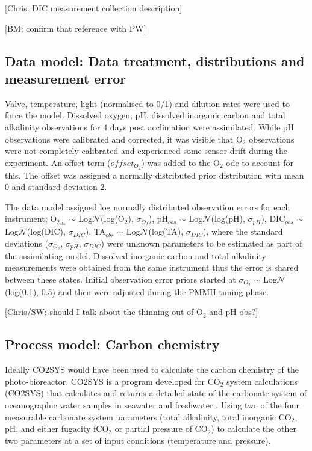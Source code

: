 \documentclass{ruthesis}
\begin{document}
[Chris: DIC measurement collection description]

[BM: confirm that reference with PW]


\subsection{Data model: Data treatment, distributions and measurement error}

Valve, temperature, light (normalised to 0/1) and dilution rates were used to force the model.
Dissolved oxygen, pH, dissolved inorganic carbon and total alkalinity observations for 4 days post acclimation were assimilated. 
While pH observations were calibrated and corrected, it was visible that O$_2$ observations were not completely calibrated and experienced some sensor drift during the experiment. An offset term ($offset_{O_2}$) was added to the O$_2$ ode to account for this. The offset was assigned a normally distributed prior distribution with mean 0 and standard deviation 2. 

The data model assigned log normally distributed observation errors for each instrument;
O$_{2_{obs}}$ $\sim$ Log$\mathcal{N}$(log(O$_2$), $\sigma_{O_2}$), pH$_{obs}$ $\sim$ Log$\mathcal{N}$(log(pH),  $\sigma_{pH}$), DIC$_{obs}$ $\sim$ Log$\mathcal{N}$(log(DIC), $\sigma_{DIC}$), TA$_{obs}$ $\sim$ Log$\mathcal{N}$(log(TA), $\sigma_{DIC}$), where the standard deviations ($\sigma_{O_2}$, $\sigma_{pH}$, $\sigma_{DIC}$) were unknown parameters to be estimated as part of the assimilating model. Dissolved inorganic carbon and total alkalinity measurements were obtained from the same instrument thus the error is shared between these states. Initial observation error priors started at $\sigma_{O_2}$ $\sim$ Log$\mathcal{N}$(log(0.1), 0.5) and then were adjusted during the PMMH tuning phase. 


[Chris/SW: should I talk about the thinning out of O$_2$ and pH obs?]


\subsection{Process model: Carbon chemistry}

Ideally CO2SYS \cite{lewis1998program} would have been used to calculate the carbon chemistry of the photo-bioreactor. 
CO2SYS is a program developed for CO$_2$ system calculations (CO2SYS) that calculates and returns a detailed state of the carbonate system of oceanographic water samples in seawater and freshwater \cite{lewis1998program}.
Using two of the four measurable carbonate system parameters (total alkalinity, total inorganic CO$_2$, pH, and either fugacity fCO$_2$ or partial pressure of CO$_2$) to calculate the other two parameters at a set of input conditions (temperature and pressure). 
\end{document}
